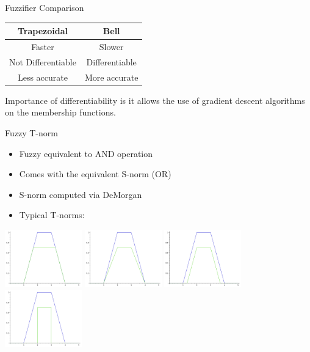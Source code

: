 \documentclass{beamer}
\begin{document}
\begin{frame}{Fuzzifier Comparison}
	\begin{tabular}{c|c}
		Trapezoidal & Bell \\ \hline
		Faster & Slower \\
		Not Differentiable & Differentiable \\
		Less accurate & More accurate
	\end{tabular}

	Importance of differentiability is it allows the use of gradient descent
	algorithms on the membership functions.
\end{frame}

\begin{frame}{Fuzzy T-norm}
	\begin{itemize}
		\item Fuzzy equivalent to AND operation
		\item Comes with the equivalent S-norm (OR)
		\item S-norm computed via DeMorgan
		\item Typical T-norms:
	\end{itemize}

	\begin{multicols}{4}
		\includegraphics[width=0.25\textwidth]{classical_tnorm}
		\includegraphics[width=0.25\textwidth]{algebraic_tnorm}
		\includegraphics[width=0.25\textwidth]{bounded_tnorm}
		\includegraphics[width=0.25\textwidth]{basic_tnorm}
	\end{multicols}
\end{frame}
\end{document}
